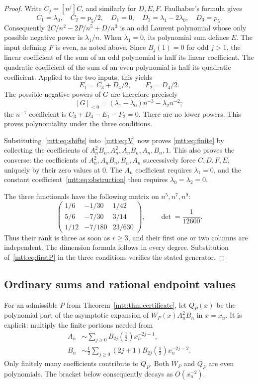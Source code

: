 \begin{proof}
Write $C_j=[n^j]C$, and similarly for $D,E,F$. Faulhaber's formula gives
\[
 C_1=\lambda_0,\quad C_2=p_5/2,\quad
 D_1=0,\quad D_2=\lambda_1-2\lambda_0,\quad D_3=p_5.
\]
Consequently $2C/n^2-2P/n^5+D/n^3$ is an odd Laurent polynomial
whose only possible negative power is $\lambda_1/n$.
When $\lambda_1=0$, its polynomial sum defines $E$.
The input defining $F$ is even, as noted above. Since
$B_j(1)=0$ for odd $j>1$, the linear coefficient of the sum of an
odd polynomial is half its linear coefficient. The quadratic coefficient
of the sum of an even polynomial is half its quadratic coefficient.
Applied to the two inputs, this yields
\[
 E_1=C_3+D_4/2,\qquad F_2=D_4/2.
\]
The possible negative powers of $G$ are therefore precisely
\begin{equation}\label{mtt:eq:obstruction}
 [G]_{<0}
   =(\lambda_1-\lambda_0)n^{-3}-\lambda_2n^{-2};
\end{equation}
the $n^{-1}$ coefficient is $C_3+D_4-E_1-F_2=0$.
There are no lower powers. This proves polynomiality under the three
conditions.

Substituting~\eqref{mtt:eq:shifts} into~\eqref{mtt:eq:V} now proves
\eqref{mtt:eq:finite} by collecting the coefficients of
$A_n^2B_n,A_n^2,A_nB_n,A_n,B_n,1$. This also proves the converse:
the coefficients of $A_n^2,A_nB_n,B_n,A_n$ successively force
$C,D,F,E$, uniquely by their zero values at $0$.
The $A_n$ coefficient requires $\lambda_1=0$, and the constant
coefficient~\eqref{mtt:eq:obstruction} then requires
$\lambda_0=\lambda_2=0$.

The three functionals have the following matrix on $n^5,n^7,n^9$:
\[
 \begin{pmatrix}
  1/6&-1/30&1/42\\
  5/6&-7/30&3/14\\
  1/12&-7/180&23/630
 \end{pmatrix},
 \qquad \det=\frac1{12600}.
\]
Thus their rank is three as soon as $r\ge3$, and their first one or two
columns are independent. The dimension formula follows in every degree.
Substitution of~\eqref{mtt:eq:firstP} in the three conditions verifies
the stated generator.
\end{proof}

\subsection{Ordinary sums and rational endpoint values}
For an admissible $P$ from Theorem~\ref{mtt:thm:certificate}, let $Q_P(x)$
be the polynomial part of the asymptotic expansion of
$W_P(x)A_n^2B_n$ in $x=x_n$. It is explicit: multiply the finite portions
needed from
\begin{align}
 A_n&\sim\sum_{j\ge0}B_{2j}(\tfrac12)x_n^{-2j-1},\label{mtt:eq:centeredA}\\
 B_n&\sim\frac12\sum_{j\ge0}(2j+1)B_{2j}(\tfrac12)x_n^{-2j-2}.
 \label{mtt:eq:centeredB}
\end{align}
Only finitely many coefficients contribute to $Q_P$.
Both $W_P$ and $Q_P$ are even polynomials. The bracket below consequently
decays as $O(x_n^{-2})$.

